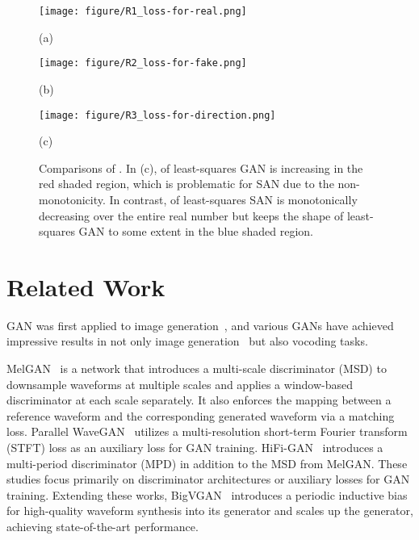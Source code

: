 \documentclass{article}
\begin{document}
\begin{figure*}[htb]
\begin{minipage}[b]{0.3\linewidth}
  \centering
  \centerline{\texttt{[image: figure/R1\_loss-for-real.png]}}
  \centerline{(a) }\medskip
\end{minipage}
\hfill
\begin{minipage}[b]{.3\linewidth}
  \centering
  \centerline{\texttt{[image: figure/R2\_loss-for-fake.png]}}
  \centerline{(b) }\medskip
\end{minipage}
\hfill
\begin{minipage}[b]{0.3\linewidth}
  \centering
  \centerline{\texttt{[image: figure/R3\_loss-for-direction.png]}}
  \centerline{(c) }\medskip
\end{minipage}
\caption{Comparisons of  . In (c),  of least-squares GAN is increasing in the red shaded region, which is problematic for SAN due to the non-monotonicity. In contrast,  of least-squares SAN is monotonically decreasing over the entire real number but keeps the shape of least-squares GAN to some extent in the blue shaded region.}
\label{fig:comparision_objectives}
\end{figure*}

\section{Related Work}
\label{sec:relateed_work}

GAN was first applied to image generation~\cite{goodfellow2014generative}, and various GANs have achieved impressive results in not only image generation~\cite{karras2019style,sauer2022styleganxl} but also vocoding tasks.

MelGAN~\cite{kumar2019melgan} is a network that introduces a multi-scale discriminator (MSD) to downsample waveforms at multiple scales and applies a window-based discriminator at each scale separately. It also enforces the mapping between a reference waveform and the corresponding generated waveform via a matching loss. Parallel WaveGAN~\cite{yamamoto2020parallel} utilizes a multi-resolution short-term Fourier transform (STFT) loss as an auxiliary loss for GAN training. HiFi-GAN~\cite{kong2020hifigan} introduces a multi-period discriminator (MPD) in addition to the MSD from MelGAN. 
These studies focus primarily on discriminator architectures or auxiliary losses for GAN training. Extending these works, BigVGAN~\cite{lee2023bigvgan} introduces a periodic inductive bias for high-quality waveform synthesis into its generator and scales up the generator, achieving state-of-the-art performance.
\end{document}
